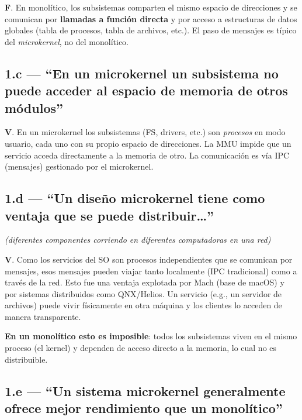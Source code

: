 \documentclass[11pt,a4paper]{article}
\begin{document}
\begin{respuesta}
\textbf{F}. En monolítico, los subsistemas comparten el mismo
espacio de direcciones y se comunican por \textbf{llamadas a función
directa} y por acceso a estructuras de datos globales (tabla de
procesos, tabla de archivos, etc.). El paso de mensajes es típico
del \emph{microkernel}, no del monolítico.
\end{respuesta}

\subsection*{1.c --- ``En un microkernel un subsistema no puede acceder al espacio de memoria de otros módulos''}

\begin{respuesta}
\textbf{V}. En un microkernel los subsistemas (FS, drivers, etc.)
son \emph{procesos} en modo usuario, cada uno con su propio espacio
de direcciones. La MMU impide que un servicio acceda directamente a
la memoria de otro. La comunicación es vía IPC (mensajes) gestionado
por el microkernel.
\end{respuesta}

\subsection*{1.d --- ``Un diseño microkernel tiene como ventaja que se puede distribuir\ldots''}

\emph{(diferentes componentes corriendo en diferentes computadoras
en una red)}

\begin{respuesta}
\textbf{V}. Como los servicios del SO son procesos independientes
que se comunican por mensajes, esos mensajes pueden viajar tanto
localmente (IPC tradicional) como a través de la red. Esto fue una
ventaja explotada por Mach (base de macOS) y por sistemas
distribuidos como QNX/Helios. Un servicio (e.g., un servidor de
archivos) puede vivir físicamente en otra máquina y los clientes lo
acceden de manera transparente.

\textbf{En un monolítico esto es imposible}: todos los subsistemas
viven en el mismo proceso (el kernel) y dependen de acceso directo
a la memoria, lo cual no es distribuible.
\end{respuesta}

\subsection*{1.e --- ``Un sistema microkernel generalmente ofrece mejor rendimiento que un monolítico''}
\end{document}
